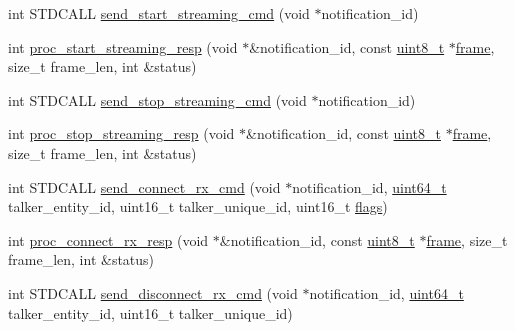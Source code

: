 \begin{DoxyCompactItemize}
\item 
int S\+T\+D\+C\+A\+LL \hyperlink{classavdecc__lib_1_1stream__input__descriptor__imp_a928dd8b641c5c6ed158ae15ad7ad3043}{send\+\_\+start\+\_\+streaming\+\_\+cmd} (void $\ast$notification\+\_\+id)
\item 
int \hyperlink{classavdecc__lib_1_1stream__input__descriptor__imp_a00065113c82302cc2e166c7a0c5f53c5}{proc\+\_\+start\+\_\+streaming\+\_\+resp} (void $\ast$\&notification\+\_\+id, const \hyperlink{stdint_8h_aba7bc1797add20fe3efdf37ced1182c5}{uint8\+\_\+t} $\ast$\hyperlink{gst__avb__playbin_8c_ac8e710e0b5e994c0545d75d69868c6f0}{frame}, size\+\_\+t frame\+\_\+len, int \&status)
\item 
int S\+T\+D\+C\+A\+LL \hyperlink{classavdecc__lib_1_1stream__input__descriptor__imp_a528a63dd6b8e71eb0cffcf5cb20936a2}{send\+\_\+stop\+\_\+streaming\+\_\+cmd} (void $\ast$notification\+\_\+id)
\item 
int \hyperlink{classavdecc__lib_1_1stream__input__descriptor__imp_a68bca93326a78c7c727b621208e3c804}{proc\+\_\+stop\+\_\+streaming\+\_\+resp} (void $\ast$\&notification\+\_\+id, const \hyperlink{stdint_8h_aba7bc1797add20fe3efdf37ced1182c5}{uint8\+\_\+t} $\ast$\hyperlink{gst__avb__playbin_8c_ac8e710e0b5e994c0545d75d69868c6f0}{frame}, size\+\_\+t frame\+\_\+len, int \&status)
\item 
int S\+T\+D\+C\+A\+LL \hyperlink{classavdecc__lib_1_1stream__input__descriptor__imp_a92b0b8d9af791734f58b14c7482e86c0}{send\+\_\+connect\+\_\+rx\+\_\+cmd} (void $\ast$notification\+\_\+id, \hyperlink{parse_8c_aec6fcb673ff035718c238c8c9d544c47}{uint64\+\_\+t} talker\+\_\+entity\+\_\+id, uint16\+\_\+t talker\+\_\+unique\+\_\+id, uint16\+\_\+t \hyperlink{namespaceavdecc__lib_ab6b306ef981f5e21bb41ea2c2dbe8cd9}{flags})
\item 
int \hyperlink{classavdecc__lib_1_1stream__input__descriptor__imp_ad7b49ee931f17f5d7a27123fb7cd6082}{proc\+\_\+connect\+\_\+rx\+\_\+resp} (void $\ast$\&notification\+\_\+id, const \hyperlink{stdint_8h_aba7bc1797add20fe3efdf37ced1182c5}{uint8\+\_\+t} $\ast$\hyperlink{gst__avb__playbin_8c_ac8e710e0b5e994c0545d75d69868c6f0}{frame}, size\+\_\+t frame\+\_\+len, int \&status)
\item 
int S\+T\+D\+C\+A\+LL \hyperlink{classavdecc__lib_1_1stream__input__descriptor__imp_ad05c9c523a1c37ee05abb0a57309d010}{send\+\_\+disconnect\+\_\+rx\+\_\+cmd} (void $\ast$notification\+\_\+id, \hyperlink{parse_8c_aec6fcb673ff035718c238c8c9d544c47}{uint64\+\_\+t} talker\+\_\+entity\+\_\+id, uint16\+\_\+t talker\+\_\+unique\+\_\+id)
\item 

\end{DoxyCompactItemize}
